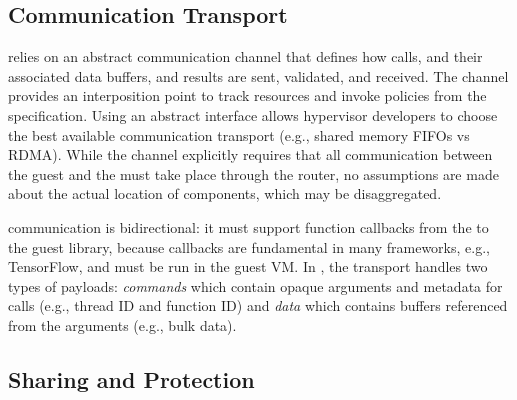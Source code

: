 
\graphicspath{{images/}}

\subsection{Communication Transport}
\label{s:design_transport}

\Model relies on an abstract communication channel that defines how
calls, and their associated data buffers, and results are sent, validated, and received.
The channel provides an interposition point to track resources and invoke policies from the \speclang specification.
Using an abstract interface allows hypervisor developers to choose the best available communication transport
(e.g., shared memory FIFOs vs RDMA).
While the channel explicitly requires that all communication between the guest
and the \worker must take place through the router, no assumptions are made
about the actual location of components, which may be
disaggregated.


\Model communication is bidirectional: it must support function callbacks from the \worker to the guest library, because
callbacks are fundamental in many frameworks, e.g., TensorFlow,
and must be run in the guest VM. %
In \model, the transport handles two types of payloads: \emph{commands} which contain opaque arguments and metadata for calls (e.g., thread ID and function ID) and \emph{data} which contains buffers referenced from the arguments (e.g., bulk data).

\subsection{Sharing and Protection}
\label{s:protection}

